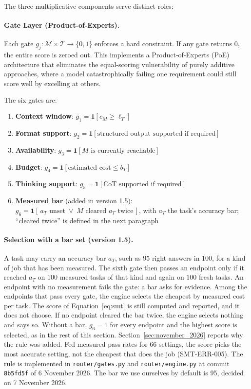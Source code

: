 The three multiplicative components serve distinct roles:

\paragraph{Gate Layer (Product-of-Experts).} Each gate $g_j: \mathcal{M} \times \mathcal{T} \to \{0, 1\}$ enforces a hard constraint. If any gate returns 0, the entire score is zeroed out. This implements a Product-of-Experts (PoE) architecture \citep{hinton1999poe} that eliminates the equal-scoring vulnerability of purely additive approaches, where a model catastrophically failing one requirement could still score well by excelling at others.

The six gates are:
\begin{enumerate}
    \item \textbf{Context window}: $g_1 = \mathbf{1}[c_M \geq \ell_T]$
    \item \textbf{Format support}: $g_2 = \mathbf{1}[\text{structured output supported if required}]$
    \item \textbf{Availability}: $g_3 = \mathbf{1}[M \text{ is currently reachable}]$
    \item \textbf{Budget}: $g_4 = \mathbf{1}[\text{estimated cost} \leq b_T]$
    \item \textbf{Thinking support}: $g_5 = \mathbf{1}[\text{CoT supported if required}]$
    \item \textbf{Measured bar} (added in version 1.5): $g_6 = \mathbf{1}[\,a_T \text{ unset} \;\lor\; M \text{ cleared } a_T \text{ twice}\,]$, with $a_T$ the task's accuracy bar; ``cleared twice'' is defined in the next paragraph
\end{enumerate}

\paragraph{Selection with a bar set (version 1.5).}
\label{par:bar_selection}
A task may carry an accuracy bar $a_T$, such as 95 right answers in 100, for a kind of job that has been measured. The sixth gate then passes an endpoint only if it reached $a_T$ on 100 measured tasks of that kind and again on 100 fresh tasks. An endpoint with no measurement fails the gate: a bar asks for evidence. Among the endpoints that pass every gate, the engine selects the cheapest by measured cost per task. The score of Equation~\ref{eq:smt} is still computed and reported, and it does not choose. If no endpoint cleared the bar twice, the engine selects nothing and says so. Without a bar, $g_6 = 1$ for every endpoint and the highest score is selected, as in the rest of this section. Section~\ref{sec:november_2026} reports why the rule was added. Fed measured pass rates for 66 settings, the score picks the most accurate setting, not the cheapest that does the job (SMT-ERR-005). The rule is implemented in \texttt{router/gates.py} and \texttt{router/engine.py} at commit \texttt{8b5fd5f} of 6 November 2026. The bar we use ourselves by default is 95, decided on 7 November 2026.

